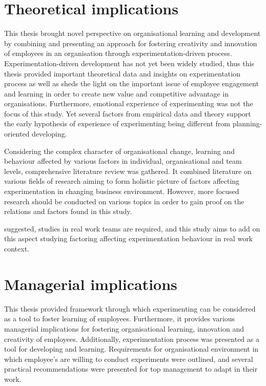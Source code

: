 \section{Theoretical implications}
This thesis brought novel perspective on organisational learning and development by combining and presenting an approach for fostering creativity and innovation of employees in an organisation through experimentation-driven process. 
Experimentation-driven development has not yet been widely studied, thus this thesis provided important theoretical data and insights on experimentation process as well as sheds the light on the important issue of employee engagement and learning in order to create new value and competitive advantage in organisations. Furthermore, emotional experience of experimenting was not the focus of this study. Yet several factors from empirical data and theory support the early hypothesis of experience of experimenting being different from planning-oriented developing. 

Considering the complex character of organisational change, learning and behaviour affected by various factors in individual, organisational and team levels, comprehensive literature review was gathered. It combined literature on various fields of research aiming to form holistic picture of factors affecting experimentation in changing business environment. However, more focused research should be conducted on various topics in order to gain proof on the relations and factors found in this study. 

\citet{edmondson1999psychological} suggested, studies in real work teams are required, and this study aims to add on this aspect studying factoring affecting experimentation behaviour in real work context. 

\section{Managerial implications}
This thesis provided framework through which experimenting can be considered as a tool to foster learning of employees. Furthermore, it provides various managerial implications for fostering organisational learning, innovation and creativity of employees. Additionally, experimentation process was presented as a tool for developing and learning. Requirements for organisational environment in which employee's are willing to conduct experiments were outlined, and several practical recommendations were presented for top management to adapt in their work.

